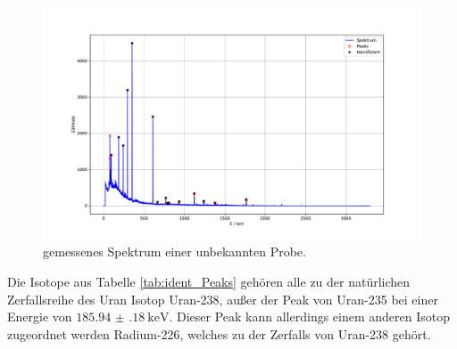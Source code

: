\begin{figure}
  \centering
  \caption{gemessenes Spektrum einer unbekannten Probe.}
  \label{fig:Peaks_04}
  \includegraphics[width=\textwidth,keepaspectratio]{figure/04_peaks.pdf}
\end{figure}
\FloatBarrier
Die Isotope aus Tabelle \ref{tab:ident_Peaks} gehören alle zu der natürlichen Zerfallsreihe des Uran Isotop Uran-238, 
außer der Peak von Uran-235 bei einer Energie von $\SI{185.94(18)}{\kilo\eV}$. Dieser Peak kann allerdings einem anderen 
Isotop zugeordnet werden Radium-226, welches zu der Zerfalls von Uran-238 gehört.








